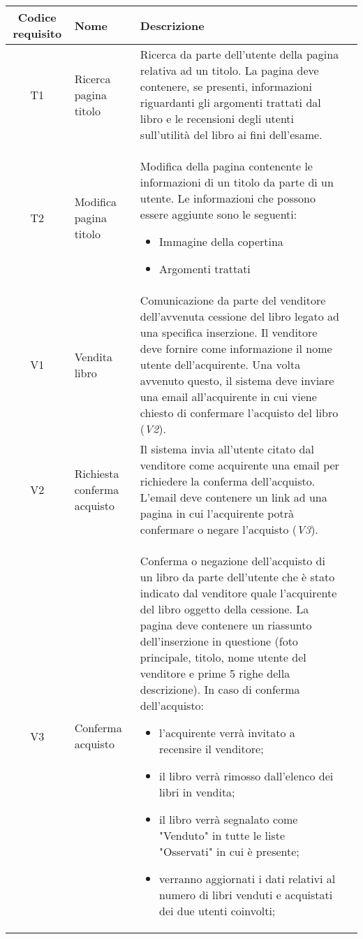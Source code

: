 \documentclass[10pt,a4paper]{book}
\begin{document}
	\newpage
	\begin{tabular}{cp{3cm}p{9cm}p{1cm}}
		Codice requisito&Nome&Descrizione\\ \hline
		T1&Ricerca pagina titolo&Ricerca da parte dell'utente della pagina relativa ad un titolo. La pagina deve contenere, se presenti, informazioni riguardanti gli argomenti trattati dal libro e le recensioni degli utenti sull'utilità del libro ai fini dell'esame.\\ \hline
		T2&Modifica pagina titolo&Modifica della pagina contenente le informazioni di un titolo da parte di un utente. Le informazioni che possono essere aggiunte sono le seguenti:
		\begin{itemize}
			\item Immagine della copertina
			\item Argomenti trattati
		\end{itemize}\\ \hline
		V1&Vendita libro&Comunicazione da parte del venditore dell'avvenuta cessione del libro legato ad una specifica inserzione. Il venditore deve fornire come informazione il nome utente dell'acquirente. Una volta avvenuto questo, il sistema deve inviare una email all'acquirente in cui viene chiesto di confermare l'acquisto del libro (\textit{V2}).\\ \hline
		V2&Richiesta conferma acquisto&Il sistema invia all'utente citato dal venditore come acquirente una email per richiedere la conferma dell'acquisto. L'email deve contenere un link ad una pagina in cui l'acquirente potrà confermare o negare l'acquisto (\textit{V3}).\\ \hline
		V3&Conferma acquisto&Conferma o negazione dell'acquisto di un libro da parte dell'utente che è stato indicato dal venditore quale l'acquirente del libro oggetto della cessione. La pagina deve contenere un riassunto dell'inserzione in questione (foto principale, titolo, nome utente del venditore e prime 5 righe della descrizione).
		In caso di conferma dell'acquisto:
		\begin{itemize}
			\item l'acquirente verrà invitato a recensire il venditore;
			\item il libro verrà rimosso dall'elenco dei libri in vendita;
			\item il libro verrà segnalato come "Venduto" in tutte le liste "Osservati" in cui è presente;
			\item verranno aggiornati i dati relativi al numero di libri venduti e acquistati dei due utenti coinvolti;

\end{itemize}
\end{tabular}
\end{document}
